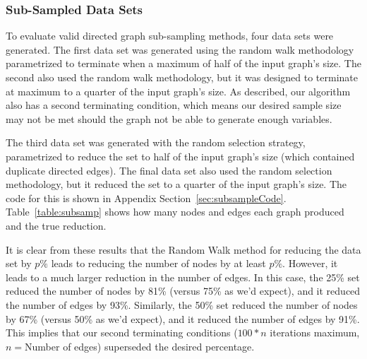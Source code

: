 \documentclass[pdftex,11pt,a4paper,twocolumn]{scrartcl}
\begin{document}
\subsubsection{Sub-Sampled Data Sets}
To evaluate valid directed graph sub-sampling methods, four data sets were generated. The first data set was generated using the random walk methodology parametrized to terminate when a maximum of half of the input graph's size. The second also used the random walk methodology, but it was designed to terminate at maximum to a quarter of the input graph's size. As described, our algorithm also has a second terminating condition, which means our desired sample size may not be met should the graph not be able to generate enough variables.

The third data set was generated with the random selection strategy, parametrized to reduce the set to half of the input graph's size (which contained duplicate directed edges). The final data set also used the random selection methodology, but it reduced the set to a quarter of the input graph's size. The code for this is shown in Appendix Section~\ref{sec:subsampleCode}. Table~\ref{table:subsamp} shows how many nodes and edges each graph produced and the true reduction. 

\begin{table}[h]
\centering
{}
\caption{Comparison of Subsampled Graphs}
\label{table:subsamp}
\end{table}

It is clear from these results that the Random Walk method for reducing the data set by $p\%$ leads to reducing the number of nodes by at least $p\%$. However, it leads to a much larger reduction in the number of edges. In this case, the 25\% set reduced the number of nodes by 81\% (versus 75\% as we'd expect), and it reduced the number of edges by 93\%. Similarly, the 50\% set reduced the number of nodes by 67\% (versus 50\% as we'd expect), and it reduced the number of edges by 91\%. This implies that our second terminating conditions ($100*n$ iterations maximum, $n=$Number of edges) superseded the desired percentage.
\end{document}
